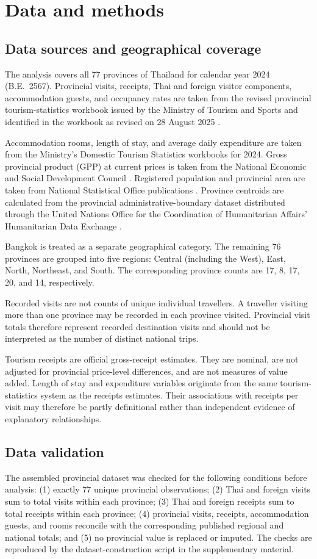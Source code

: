 \documentclass[11pt,a4paper]{article}
\begin{document}
\section{Data and methods}
\subsection{Data sources and geographical coverage}
The analysis covers all 77 provinces of Thailand for calendar year 2024 (B.E.\ 2567). Provincial visits, receipts, Thai and foreign visitor components, accommodation guests, and occupancy rates are taken from the revised provincial tourism-statistics workbook issued by the Ministry of Tourism and Sports and identified in the workbook as revised on 28 August 2025 \citep{mots2025a}.

Accommodation rooms, length of stay, and average daily expenditure are taken from the Ministry's Domestic Tourism Statistics workbooks for 2024. Gross provincial product (GPP) at current prices is taken from the National Economic and Social Development Council \citep{nesdc2025}. Registered population and provincial area are taken from National Statistical Office publications \citep{nso2025,nso2026}. Province centroids are calculated from the provincial administrative-boundary dataset distributed through the United Nations Office for the Coordination of Humanitarian Affairs' Humanitarian Data Exchange \citep{ocha2019}.

Bangkok is treated as a separate geographical category. The remaining 76 provinces are grouped into five regions: Central (including the West), East, North, Northeast, and South. The corresponding province counts are 17, 8, 17, 20, and 14, respectively.

Recorded visits are not counts of unique individual travellers. A traveller visiting more than one province may be recorded in each province visited. Provincial visit totals therefore represent recorded destination visits and should not be interpreted as the number of distinct national trips.

Tourism receipts are official gross-receipt estimates. They are nominal, are not adjusted for provincial price-level differences, and are not measures of value added. Length of stay and expenditure variables originate from the same tourism-statistics system as the receipts estimates. Their associations with receipts per visit may therefore be partly definitional rather than independent evidence of explanatory relationships.

\subsection{Data validation}
The assembled provincial dataset was checked for the following conditions before analysis: (1) exactly 77 unique provincial observations; (2) Thai and foreign visits sum to total visits within each province; (3) Thai and foreign receipts sum to total receipts within each province; (4) provincial visits, receipts, accommodation guests, and rooms reconcile with the corresponding published regional and national totals; and (5) no provincial value is replaced or imputed. The checks are reproduced by the dataset-construction script in the supplementary material.
\end{document}
